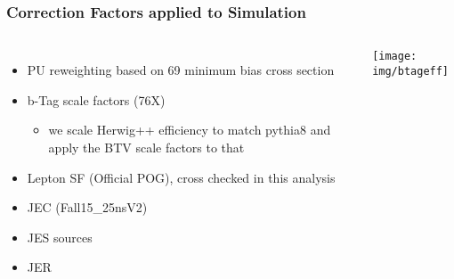 \documentclass{beamer}
\begin{document}
\begin{frame}
\frametitle{Correction Factors applied to Simulation}
\begin{columns}
\begin{itemize}
\scriptsize
\item PU reweighting based on 69 minimum bias cross section
\item b-Tag scale factors (76X)
\begin{itemize}
\scriptsize
\item we scale Herwig++ efficiency to match pythia8 and apply the BTV scale factors to that
\end{itemize}
\scriptsize
\item Lepton SF (Official POG), cross checked in this analysis
\item JEC (Fall15\_25nsV2)
\item JES sources \href {https://twiki.cern.ch/twiki/bin/view/CMS/JECUncertaintySources}{}
\item JER \href {https://twiki.cern.ch/twiki/bin/view/CMS/JetResolution}{}
\end{itemize}
\texttt{[image: img/btageff]}
\end{columns}
\end{frame}
\begin{comment}
\begin{frame}
\frametitle{Correction Factors applied to Simulation}
\begin{center}
\texttt{[image: img/btageff]}
\end{center}
\begin{itemize}
\tiny
\item PU reweighting based on 69 minimum bias cross section
\item b-Tag scale factors (76X)
\begin{itemize}
\tiny
\item we scale Herwig++ efficiency to match pythia 8 aand apply the BTV scale factors to that
\end{itemize}
\item Lepton SF (Official POG), cross checked in this analysis
\item JEC (Fall15\_25nsV2)
\item JES \href {https://twiki.cern.ch/twiki/bin/view/CMS/JECUncertaintySources}{\beamergotobutton{JES sources}}
\item JER \href {https://twiki.cern.ch/twiki/bin/view/CMS/JetResolution}{\beamergotobutton{https://twiki.cern.ch/twiki/bin/view/CMS/JetResolution}}
\end{itemize}
\end{frame}
\end{comment}
\end{document}
